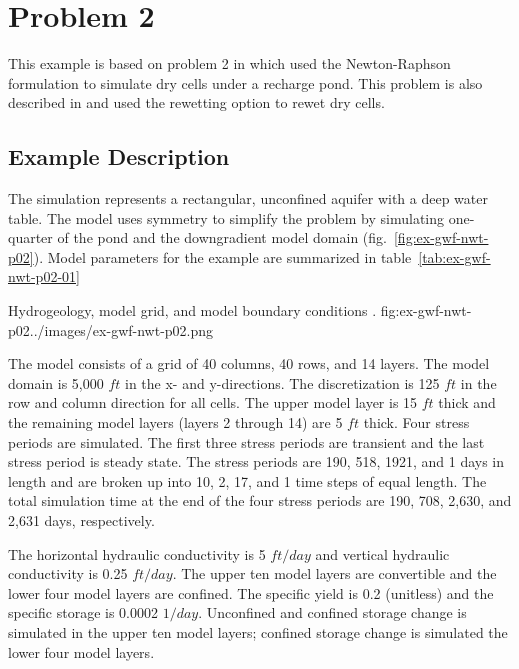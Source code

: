 \section{\mfn Problem 2}

This example is based on problem 2 in \cite{modflownwt} which used the Newton-Raphson formulation to simulate dry cells under a recharge pond. This problem is also described in \cite{mcdonaldetal1991wetdry} and used the \MF rewetting option to rewet dry cells.

\subsection{Example Description}

The simulation represents a rectangular, unconfined aquifer with a deep water table. The model uses symmetry to simplify the problem by simulating one-quarter of the pond and the downgradient model domain (fig.~\ref{fig:ex-gwf-nwt-p02}). Model parameters for the example are summarized in table~\ref{tab:ex-gwf-nwt-p02-01} 

\begin{StandardFigure}{
                                     Hydrogeology, model grid, and model boundary conditions
                                     \cite[from][]{mcdonaldetal1991wetdry}.
                                     }{fig:ex-gwf-nwt-p02}{../images/ex-gwf-nwt-p02.png}
\end{StandardFigure}                                 


The model consists of a grid of 40 columns, 40 rows, and 14 layers. The model domain is  5,000 $ft$ in the x- and y-directions. The discretization is 125 $ft$ in the row and column direction for all cells. The upper model layer is 15 $ft$ thick and the remaining model layers (layers 2 through 14) are 5 $ft$ thick. Four stress periods are simulated. The first three stress periods are transient and the last stress period is steady state. The stress periods are 190, 518, 1921, and 1 days in length and are broken up into 10, 2, 17, and 1 time steps of equal length. The total simulation time at the end of the four stress periods are 190, 708, 2,630, and 2,631 days, respectively.



The horizontal hydraulic conductivity is 5 $ft/day$ and vertical hydraulic conductivity is 0.25 $ft/day$. The upper ten model layers are convertible and the lower four model layers are confined. The specific yield is 0.2 (unitless) and the specific storage is 0.0002 $1/day$. Unconfined and confined storage change is simulated in the upper ten model layers; confined storage change is simulated the lower four model layers.


